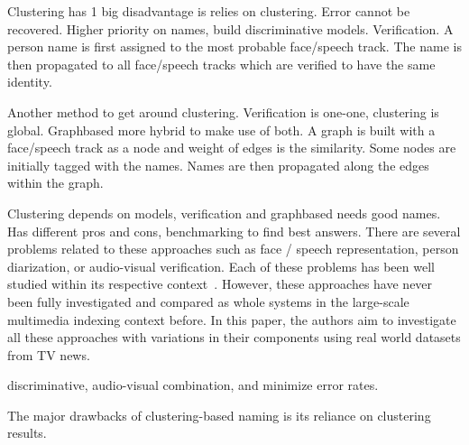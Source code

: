 Clustering has 1 big disadvantage is relies on clustering. Error cannot be recovered. Higher priority on names, build discriminative models.
Verification.
A person name is first assigned to the most probable face/speech track. The name is then propagated to all face/speech tracks which are verified to have the same identity.

 Another method to get around clustering. Verification is one-one, clustering is global. Graphbased more hybrid to make use of both.
A graph is built with a face/speech track as a node and weight of edges is the similarity. Some nodes are initially tagged with the names. Names are then propagated along the edges within the graph.

Clustering depends on models, verification and graphbased needs good names. Has different pros and cons, benchmarking to find best answers.
There are several problems related to these approaches such as face / speech representation, person diarization, or audio-visual verification. Each of these problems has been well studied within its respective context~\cite{recog,veri,rep}. 
%
However, these approaches have never been fully investigated and compared as whole systems in the large-scale multimedia indexing context before. In this paper, the authors aim to investigate all these approaches with variations in their components using real world datasets from TV news. 

discriminative, audio-visual combination, and minimize error rates.

The major drawbacks of clustering-based naming is its reliance on clustering results. 

\endinput